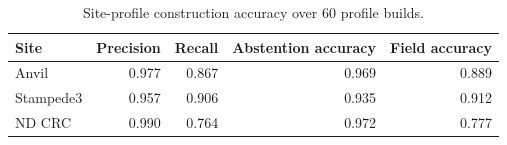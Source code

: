 \begin{table}[t]
\caption{Site-profile construction accuracy over 60 profile builds.}
\label{tab:rq1-site-accuracy}
\centering
\footnotesize
\setlength{\tabcolsep}{4pt}
\begin{tabular}{lrrrr}
\toprule
Site & Precision & Recall & Abstention accuracy & Field accuracy \\
\midrule
Anvil & 0.977 & 0.867 & 0.969 & 0.889 \\
Stampede3 & 0.957 & 0.906 & 0.935 & 0.912 \\
ND CRC & 0.990 & 0.764 & 0.972 & 0.777 \\
\bottomrule
\end{tabular}
\end{table}